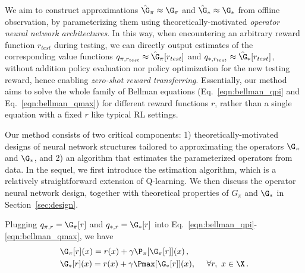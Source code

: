 We aim to construct approximations $\hat\G_{\pi} \approx \G_\pi$ and $\hat\G_{*} \approx \G_*$ from offline observation, 
by parameterizing them using theoretically-motivated \emph{operator neural network architectures}.  
In this way, when encountering an arbitrary reward function $r_{test}$ during testing, we can directly 
output estimates of the corresponding value functions 
$q_{\pi,r_{test}} \approx \hat\G_{\pi}[r_{test}]$ and $q_{*,r_{test}} \approx \hat\G_{*}[r_{test}]$, 
without addition policy evaluation nor policy optimization for the new testing reward,
hence enabling \emph{zero-shot reward transferring}. 
Essentially, our method aims to solve the whole family of Bellman equations (Eq.~\eqref{eqn:bellman_qpi} and Eq.~\eqref{eqn:bellman_qmax})
for different reward functions $r$, 
rather than a single equation with a fixed $r$ like typical RL settings. 

Our method consists of two critical components: 
1)  theoretically-motivated designs of neural network structures
tailored to approximating the operators $\G_{\pi}$ and $\G_{*}$,
and 2) an algorithm that estimates the parameterized operators from data. 
In the sequel, we first introduce the estimation algorithm, 
which is a relatively straightforward extension of Q-learning.  %
We then discuss the operator neural network design, 
together with theoretical properties of $G_\pi$ and $\G_*$ in Section~\ref{sec:design}. 


Plugging $q_{\pi,r} = \G_{\pi}[r]$ and $q_{*,r} = \G_{*}[r]$ into Eq.~\eqref{eqn:bellman_qpi}-\eqref{eqn:bellman_qmax}, we have 
\begin{align*} 
&\G_{\pi}[r](x) = r(x) + \gamma \P_\pi[\G_\pi[r]](x)\,, \\
&\G_{*}[r](x) = r(x) + \gamma \Pmax[\G_*[r]](x),~~~~\forall r, ~x \in \X\,.
\end{align*}

